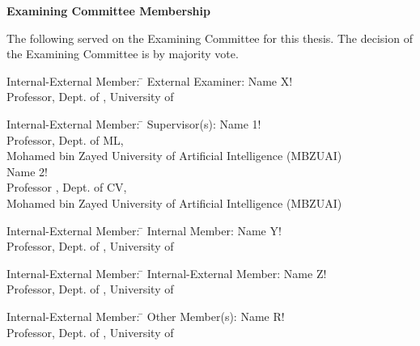 \cleardoublepage %

 
\begin{center}\textbf{Examining Committee Membership}\end{center}
  \noindent
The following served on the Examining Committee for this thesis. The decision of the Examining Committee is by majority vote.
  \bigskip
  
  \noindent
\begin{tabbing}
Internal-External Member: \=  \kill %
External Examiner: \>  Name X! \\ 
\> Professor, Dept. of , University of \\
\end{tabbing} 
  \bigskip
  
  \noindent
\begin{tabbing}
Internal-External Member: \=  \kill %
Supervisor(s): \> Name 1!\\
\> Professor, Dept. of ML, \\Mohamed bin Zayed University of Artificial Intelligence (MBZUAI) \\
\> Name 2! \\
\> Professor , Dept. of CV, \\Mohamed bin Zayed University of Artificial Intelligence (MBZUAI) \\
\end{tabbing}
  \bigskip
  
  \noindent
  \begin{tabbing}
Internal-External Member: \=  \kill %
Internal Member: \> Name Y! \\
\> Professor, Dept. of , University of  \\
\end{tabbing}
  \bigskip
  
  \noindent
\begin{tabbing}
Internal-External Member: \=  \kill %
Internal-External Member: \> Name Z! \\
\> Professor, Dept. of , University of  \\
\end{tabbing}
  \bigskip
  
  \noindent
\begin{tabbing}
Internal-External Member: \=  \kill %
Other Member(s): \> Name R! \\
\> Professor, Dept. of , University of \\
\end{tabbing}

\cleardoublepage